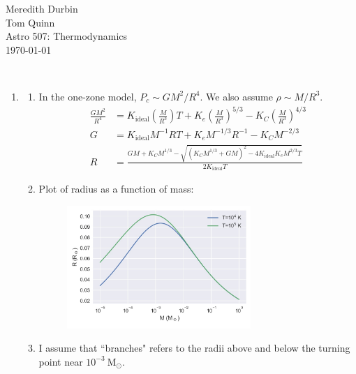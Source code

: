 \documentclass[11pt]{article}
\newcommand\density{\left( \frac{M}{R^3} \right)}
\newcommand\kideal{K_\mathrm{ideal}}
\begin{document}
\begin{flushright}Meredith Durbin\\
Tom Quinn\\
Astro 507: Thermodynamics\\
\today\\

\end{flushright}

 \\[6pt]

\begin{enumerate}

\item
	\begin{enumerate}
    \item In the one-zone model, $P_c \sim GM^2/R^4$. We also assume $\rho \sim M/R^3$.
    \begin{align}
    \frac{GM^2}{R^4} &= \kideal\density T + K_e\density^{5/3} - K_C\density^{4/3} \\
    G &= \kideal M^{-1}RT + K_e M^{-1/3} R^{-1} - K_C M^{-2/3} \\ 
    R &= \frac{GM + K_CM^{1/3} - \sqrt{ (K_C M^{1/3} + GM)^2 - 4\kideal K_e M^{2/3} T } }{2\kideal T}
    \end{align}
    
    \item Plot of radius as a function of mass:
    \begin{figure}[H]
    \centering
    \includegraphics[width=0.7\textwidth]{mass_radius.jpg}
    \end{figure}
    
    \item I assume that ``branches" refers to the radii above and below the turning point near $10^{-3}~\mathrm{M}_\odot$.
    \end{enumerate}

\end{enumerate}
\end{document}
